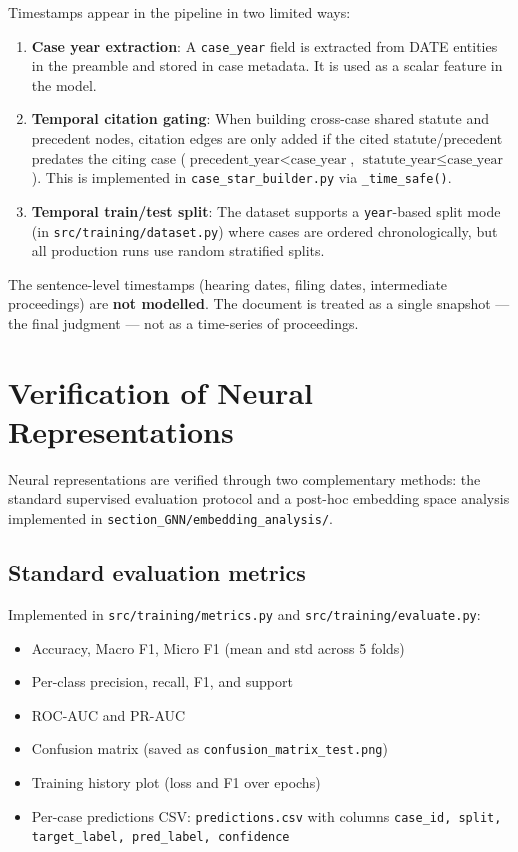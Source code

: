 \documentclass[12pt,a4paper]{article}
\begin{document}
Timestamps appear in the pipeline in two limited ways:
\begin{enumerate}[noitemsep]
  \item \textbf{Case year extraction}: A \texttt{case\_year} field is extracted from DATE entities in the preamble and stored in case metadata. It is used as a scalar feature in the model.
  \item \textbf{Temporal citation gating}: When building cross-case shared statute and precedent nodes, citation edges are only added if the cited statute/precedent predates the citing case ($\text{precedent\_year} < \text{case\_year}$, $\text{statute\_year} \leq \text{case\_year}$). This is implemented in \texttt{case\_star\_builder.py} via \texttt{\_time\_safe()}.
  \item \textbf{Temporal train/test split}: The dataset supports a \texttt{year}-based split mode (in \texttt{src/training/dataset.py}) where cases are ordered chronologically, but all production runs use random stratified splits.
\end{enumerate}

The sentence-level timestamps (hearing dates, filing dates, intermediate proceedings) are \textbf{not modelled}. The document is treated as a single snapshot — the final judgment — not as a time-series of proceedings.

\section{Verification of Neural Representations}

Neural representations are verified through two complementary methods: the standard supervised evaluation protocol and a post-hoc embedding space analysis implemented in \texttt{section\_GNN/embedding\_analysis/}.

\subsection{Standard evaluation metrics}

Implemented in \texttt{src/training/metrics.py} and \texttt{src/training/evaluate.py}:
\begin{itemize}[noitemsep]
  \item Accuracy, Macro F1, Micro F1 (mean and std across 5 folds)
  \item Per-class precision, recall, F1, and support
  \item ROC-AUC and PR-AUC
  \item Confusion matrix (saved as \texttt{confusion\_matrix\_test.png})
  \item Training history plot (loss and F1 over epochs)
  \item Per-case predictions CSV: \texttt{predictions.csv} with columns \texttt{case\_id, split, target\_label, pred\_label, confidence}
\end{itemize}
\end{document}
